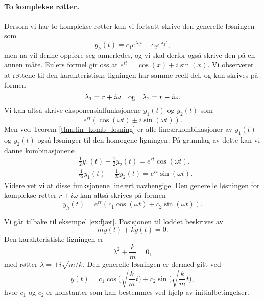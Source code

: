 \documentclass{article}
\theoremstyle{definition}
\theoremstyle{remark}
\newenvironment{ex}
{\pushQED{\qed}\renewcommand{\qedsymbol}{$\triangle$}\exx}
{\popQED\endexx}
\begin{document}
\begin{multicols*}{2}
\paragraph*{To komplekse røtter.} Dersom vi har to komplekse røtter kan vi fortsatt skrive den generelle løsningen som
\begin{equation*}
  y_h(t) = c_1 e^{\lambda_1 t} + c_2 e^{\lambda_2 t},
\end{equation*}
men nå vil denne oppføre seg annerledes, og vi skal derfor også skrive den på en annen måte. Eulers formel gir oss at $e^{i t} = \cos(x) + i \sin(x)$. Vi observerer at røttene til den karakteristiske ligningen har samme reell del, og kan skrives på formen
\begin{equation*}
  \lambda_1 = r + i \omega \ \ \textnormal{ og }\ \ \lambda_2 = r - i \omega.
\end{equation*}
Vi kan altså skrive eksponensialfunksjonene $y_1(t)$ og $y_2(t)$ som
\begin{equation*}
  e^{rt} (\cos(\omega t) \pm i \sin(\omega t)).
\end{equation*}
Men ved Teorem \ref{thm:lin_komb_losning} er alle lineærkombinasjoner av $y_1(t)$ og $y_2(t)$ også løsninger til den homogene ligningen. På grunnlag av dette kan vi danne kombinasjonene 
\begin{equation*}
  \begin{split}
    & \frac{1}{2}y_1(t) + \frac{1}{2} y_2(t) = e^{r t} \cos(\omega t), \\
    & \frac{1}{2i}y_1(t) - \frac{1}{2i} y_2(t) = e^{r t} \sin(\omega t).
  \end{split}
\end{equation*}
Videre vet vi at disse funksjonene
lineært uavhengige. Den generelle løsningen for komplekse røtter $r \pm i \omega$ kan altså skrives på formen
\begin{equation*}
  y_h(t) = e^{r t} (c_1 \cos(\omega t) + c_2 \sin(\omega t)).
\end{equation*}

\begin{ex}
  Vi går tilbake til eksempel \ref{ex:fjær}. Posisjonen til loddet beskrives av
  \begin{equation*}
    m \ddot{y}(t) + ky(t) = 0.
  \end{equation*}
  Den karakteristiske ligningen er
  \begin{equation*}
    \lambda^2 + \frac{k}{m} = 0,
  \end{equation*}
  med røtter $\lambda = \pm i \sqrt{m / k}$. Den generelle løsningen er dermed gitt ved
  \begin{equation*}
    y(t) = c_1 \cos\bigg(\sqrt{\frac{k}{m}} t\bigg) + c_2 \sin\bigg(\sqrt{\frac{k}{m}} t\bigg),
  \end{equation*}
  hvor $c_1$ og $c_2$ er konstanter som kan bestemmes ved hjelp av initialbetingelser.
\end{ex}


\end{multicols*}
\end{document}
